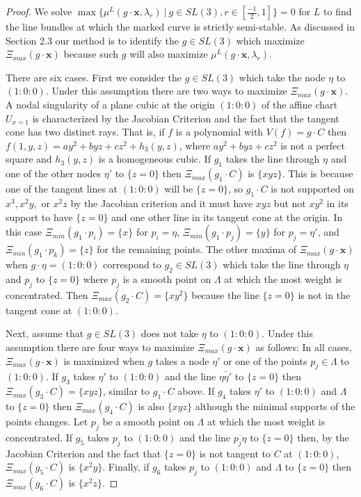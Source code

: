 \documentclass{amsart}
\numberwithin{equation}{section}
\theoremstyle{definition}
\begin{document}
\begin{proof}
We solve $\max \{\mu^L(g \cdot \mathbf{x}, \lambda_r) \ | \ g \in SL(3), r \in [\frac{-1}{2},1] \} = 0$ for $L$ to find the line bundles at which the marked curve is strictly semi-stable. As discussed in Section 2.3 our method is to identify the $g \in SL(3)$ which maximize $\Xi_{max}(g \cdot \mathbf{x})$ because such $g$ will also maximize $\mu^L (g \cdot \mathbf{x}, \lambda_r)$.

There are six cases. First we consider the $g \in SL(3)$ which take the node $\eta$ to $(1:0:0)$. Under this assumption there are two ways to maximize $\Xi_{max}(g \cdot \mathbf{x})$.  A nodal singularity of a plane cubic at the origin $(1:0:0)$ of the affine chart $U_{x=1}$ is characterized by the Jacobian Criterion and the fact that the tangent cone has two distinct rays. That is, if $f$ is a polynomial with $V(f) = g \cdot C$ then $f(1,y,z) = ay^2 + byz + cz^2 + h_3(y,z)$, where $ay^2 + byz + cz^2$ is not a perfect square and $h_3(y,z)$ is a homogeneous cubic. If $g_1$ takes the line through $\eta$ and one of the other nodes $\eta'$ to $\{z=0\}$ then  $\Xi_{max}(g_1 \cdot C)$ is $\{xyz\}$. This is because one of the tangent lines at $(1:0:0)$ will be $\{z=0\}$, so $g_1 \cdot C$ is not supported on $x^3, x^2y, $ or $x^2z$ by the Jacobian criterion and it must have $xyz$ but not $xy^2$ in its support to have $\{z=0\}$ and one other line in its tangent cone at the origin. In this case $\Xi_{min}(g_1 \cdot p_i) = \{x\}$ for $p_i = \eta$, $\Xi_{min}(g_1 \cdot p_j) = \{y\}$ for $p_j = \eta'$, and $\Xi_{min}(g_1 \cdot p_k) = \{z\}$ for the remaining points. The other maxima of $\Xi_{max}(g \cdot \mathbf{x})$ when $g \cdot \eta = (1:0:0)$ correspond to $g_2 \in SL(3)$ which take the line through $\eta$ and $p_j$ to $\{z=0\}$ where $p_j$ is a smooth point on $\Lambda$ at which the most weight is concentrated. Then $\Xi_{max}(g_2 \cdot C) = \{xy^2\}$ because the line $\{z=0\}$ is not in the tangent cone at $(1:0:0)$.

Next, assume that $g \in SL(3)$ does not take $\eta$ to $(1:0:0)$. Under this assumption there are four ways to maximize $\Xi_{max}(g \cdot \mathbf{x})$ as follows: In all cases, $\Xi_{max}(g \cdot \mathbf{x})$ is maximized when $g$ takes a node $\eta'$ or one of the points $p_j \in \Lambda$ to $(1:0:0)$. If $g_3$ takes $\eta'$ to $(1:0:0)$ and the line $\overline{\eta \eta'}$ to $\{z=0\}$ then $\Xi_{max}(g_3 \cdot C) = \{xyz\}$, similar to $g_1 \cdot C$ above. If $g_4$ takes $\eta'$ to $(1:0:0)$ and $\Lambda$ to $\{z=0\}$ then $\Xi_{max}(g_4 \cdot C)$ is also $\{xyz\}$ although the minimal supports of the points changes. Let $p_j$ be a smooth point on $\Lambda$ at which the most weight is concentrated. If $g_5$ takes $p_j$ to $(1:0:0)$ and the line $\overline{p_j \eta }$ to $\{z=0\}$ then, by the Jacobian Criterion and the fact that $\{z=0\}$ is not tangent to $C$ at $(1:0:0)$, $\Xi_{max}(g_5 \cdot C) $ is $\{x^2y\}$. Finally, if $g_6$ takes $p_j$ to $(1:0:0)$ and $\Lambda$ to $\{z=0\}$ then $\Xi_{max}(g_6 \cdot C)$ is $\{x^2z\}$.


\end{proof}
\end{document}
